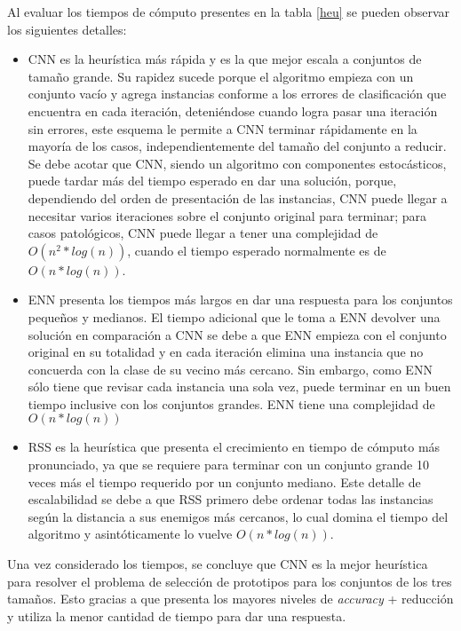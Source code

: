 Al evaluar los tiempos de cómputo presentes en la tabla \ref{heu} se pueden observar los siguientes detalles:

\begin{itemize}

\item CNN es la heurística más rápida y es la que mejor escala a conjuntos de tamaño grande. Su rapidez sucede porque el algoritmo empieza con un conjunto vacío y agrega instancias conforme a los errores de clasificación que encuentra en cada iteración, deteniéndose cuando logra pasar una iteración sin errores, este esquema le permite a CNN terminar rápidamente en la mayoría de los casos, independientemente del tamaño del conjunto a reducir. Se debe acotar que CNN, siendo un algoritmo con componentes estocásticos, puede tardar más del tiempo esperado en dar una solución, porque, dependiendo del orden de presentación de las instancias, CNN puede llegar a necesitar varios iteraciones sobre el conjunto original para terminar; para casos patológicos, CNN puede llegar a tener una complejidad de $O(n^2*log(n))$, cuando el tiempo esperado normalmente es de $O(n*log(n))$.

\item ENN presenta los tiempos más largos en dar una respuesta para los conjuntos pequeños y medianos. El tiempo adicional que le toma a ENN devolver una solución en comparación a CNN se debe a que ENN empieza con el conjunto original en su totalidad y en cada iteración elimina una instancia que no concuerda con la clase de su vecino más cercano. Sin embargo, como ENN sólo tiene que revisar cada instancia una sola vez, puede terminar en un buen tiempo inclusive con los conjuntos grandes. ENN tiene una complejidad de $O(n*log(n))$  

\item RSS es la heurística que presenta el crecimiento en tiempo de cómputo más pronunciado, ya que se requiere para terminar con un conjunto grande 10 veces más el tiempo requerido por un conjunto mediano. Este detalle de escalabilidad se debe a que RSS primero debe ordenar todas las instancias según la distancia a sus enemigos más cercanos, lo cual domina el tiempo del algoritmo y asintóticamente lo vuelve $O(n*log(n))$. 

\end{itemize}

Una vez considerado los tiempos, se concluye que CNN es la mejor heurística para resolver el problema de selección de prototipos para los conjuntos de los tres tamaños. Esto gracias a que presenta los mayores niveles de \emph{accuracy} + reducción y utiliza la menor cantidad de tiempo para dar una respuesta. 


